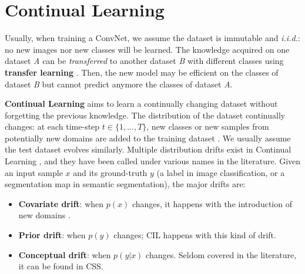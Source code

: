 \section{Continual Learning}
\label{sec:related_continual}

Usually, when training a \ac{ConvNet}, we assume the dataset is immutable and \textit{i.i.d.}: no new
images nor new classes will be learned. The knowledge acquired on one dataset \textit{A} can be
\textit{transferred} to another dataset \textit{B} with different classes using \textbf{transfer learning}
\citep{razavian2014transferlearning}. Then, the new model may be efficient on
the classes of dataset \textit{B} but cannot predict anymore the classes of dataset \textit{A}.

\textbf{Continual Learning} aims to learn a continually changing dataset without forgetting the
previous knowledge. The distribution of the dataset continually changes: \eg at each time-step $t
      \in \{1, ..., T \}$, new
classes or new samples from potentially new domains are added to the training dataset
\citep{lomonaco2017core50}. We usually assume the test dataset evolves similarly. Multiple
distribution drifts exist in Continual Learning
\citep{morenotorresa2012datasetshift,lesort2021driftanalysis}, and they have been called under
various names in the literature. Given an input sample $x$ and its ground-truth $y$ (a label in
image classification, or a segmentation map in semantic segmentation), the major drifts are:

\begin{itemize}
      \item \textbf{Covariate drift}: when $p(x)$ changes, it happens with the introduction of new
            domains \citep{volpi2021continualdomainadapt}.
      \item \textbf{Prior drift}: when $p(y)$ changes; \ac{CIL} happens with this kind of drift.
      \item \textbf{Conceptual drift}: when $p(y | x)$ changes. Seldom covered in the literature, it
            can be found in \acf{CSS}.
\end{itemize}

